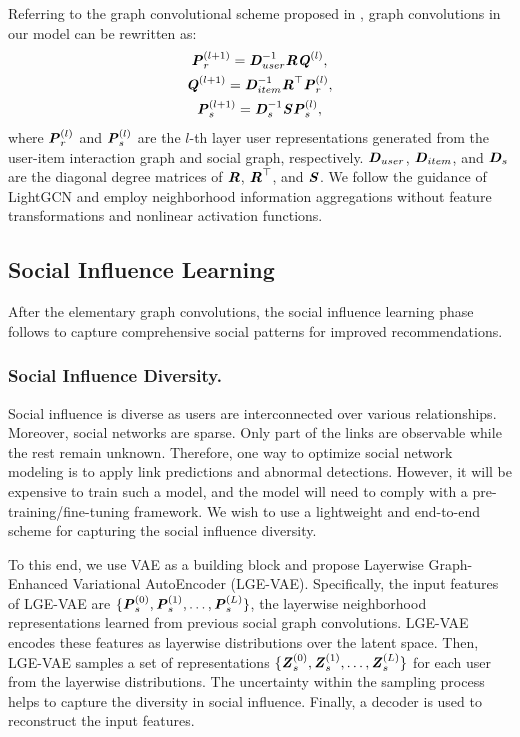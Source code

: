 \documentclass[letterpaper]{article} %
\begin{document}
Referring to the graph convolutional scheme proposed in \cite{GCN}, graph convolutions in our model can be rewritten as:
\begin{gather}
    \textbf{\textit{P}}^{(l+1)}_{r} = \textbf{\textit{D}}^{-1}_{user}\textbf{\textit{R}}\textbf{\textit{Q}}^{(l)},\\
    \textbf{\textit{Q}}^{(l+1)} = \textbf{\textit{D}}^{-1}_{item}\textbf{\textit{R}}^{\top}\textbf{\textit{P}}^{(l)}_{r},\\
    \textbf{\textit{P}}^{(l+1)}_{s} = \textbf{\textit{D}}^{-1}_{s}\textbf{\textit{S}}\textbf{\textit{P}}^{(l)}_{s},
\end{gather}
where $\textbf{\textit{P}}^{(l)}_{r}$ and $\textbf{\textit{P}}^{(l)}_{s}$ are the $l$-th layer user representations generated from the user-item interaction graph and social graph, respectively. $\textbf{\textit{D}}_{user}$, $\textbf{\textit{D}}_{item}$, and $\textbf{\textit{D}}_{s}$ are the diagonal degree matrices of $\textbf{\textit{R}}$, $\textbf{\textit{R}}^{\top}$, and $\textbf{\textit{S}}$. We follow the guidance of LightGCN \cite{lightgcn} and employ neighborhood information aggregations without feature transformations and nonlinear activation functions. 

\subsection{Social Influence Learning}
After the elementary graph convolutions, the social influence learning phase follows to capture comprehensive social patterns for improved recommendations.
\subsubsection{Social Influence Diversity.}
Social influence is diverse as users are interconnected over various relationships. Moreover, social networks are sparse. Only part of the links are observable while the rest remain unknown. Therefore, one way to optimize social network modeling is to apply link predictions and abnormal detections. However, it will be expensive to train such a model, and the model will need to comply with a pre-training/fine-tuning framework. We wish to use a lightweight and end-to-end scheme for capturing the social influence diversity. 

To this end, we use VAE \cite{VAE} as a building block and propose Layerwise Graph-Enhanced Variational AutoEncoder (LGE-VAE). Specifically, the input features of LGE-VAE are $\{\textbf{\textit{P}}^{(0)}_{s}, \textbf{\textit{P}}^{(1)}_{s}, \ldots, \textbf{\textit{P}}^{(L)}_{s}\}$, the layerwise neighborhood representations learned from previous social graph convolutions. LGE-VAE encodes these features as layerwise distributions over the latent space. Then, LGE-VAE samples a set of representations $\{\textbf{\textit{Z}}_s^{(0)}, \textbf{\textit{Z}}_s^{(1)}, \ldots, \textbf{\textit{Z}}_s^{(L)}\}$ for each user from the layerwise distributions. The uncertainty within the sampling process helps to capture the diversity in social influence. Finally, a decoder is used to reconstruct the input features. 
\end{document}

